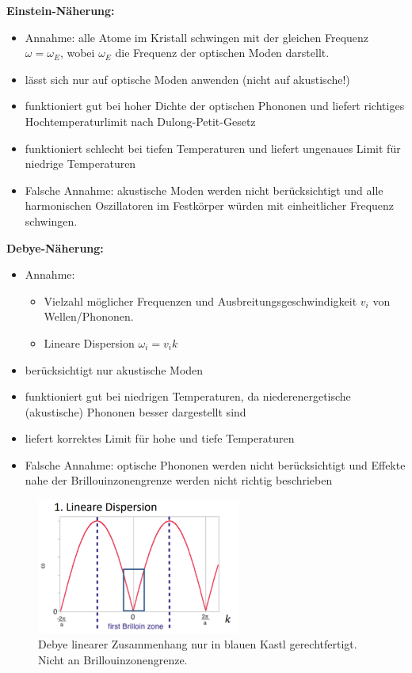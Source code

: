 \textbf{Einstein-Näherung:} 
\begin{itemize}
    \item Annahme: alle Atome im Kristall schwingen mit der gleichen Frequenz $\omega = \omega_E$, wobei $\omega_E$ die Frequenz der optischen Moden darstellt. 
    \item lässt sich nur auf optische Moden anwenden (nicht auf akustische!)
    \item funktioniert gut bei hoher Dichte der optischen Phononen und liefert richtiges 
    Hochtemperaturlimit nach Dulong-Petit-Gesetz
    \item funktioniert schlecht bei tiefen Temperaturen und liefert ungenaues Limit für niedrige Temperaturen
    \item Falsche Annahme: akustische Moden werden nicht berücksichtigt und alle harmonischen Oszillatoren im Festkörper würden mit einheitlicher Frequenz schwingen.
\end{itemize}

\textbf{Debye-Näherung:} 
\begin{itemize}
    \item Annahme: 
        \begin{itemize}
            \item Vielzahl möglicher Frequenzen und Ausbreitungsgeschwindigkeit $v_i$ von Wellen/Phononen. 
            \item Lineare Dispersion $\omega_i=v_ik$ 
        \end{itemize}
    \item berücksichtigt nur akustische Moden
    \item funktioniert gut bei niedrigen Temperaturen, da niederenergetische (akustische) Phononen besser dargestellt sind 
    \item liefert korrektes Limit für hohe und tiefe Temperaturen
    \item Falsche Annahme: optische Phononen werden nicht berücksichtigt und Effekte nahe der Brillouinzonengrenze werden nicht richtig beschrieben
\end{itemize}

\begin{figure}[H]
    \centering
    \includegraphics[width=0.6\textwidth]{resources/15-06-2015/debye_dispersion.png}
    \caption{Debye linearer Zusammenhang nur in blauen Kastl gerechtfertigt. Nicht an Brillouinzonengrenze.}
   \end{figure}

